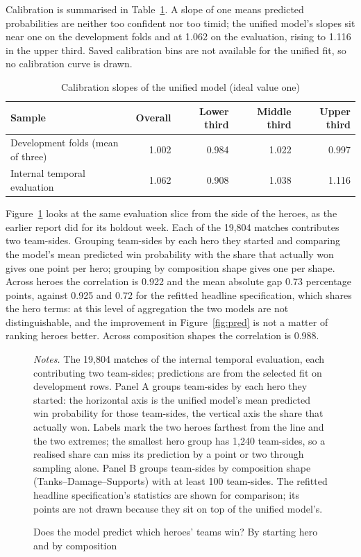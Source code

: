 \documentclass[11pt]{article}
\begin{document}
Calibration is summarised in Table~\ref{tab:cal}. A slope of one means predicted probabilities are neither
too confident nor too timid; the unified model's slopes sit near one on the development folds and at
1.062 on the evaluation, rising to 1.116 in the upper third. Saved calibration bins are
not available for the unified fit, so no calibration curve is drawn.

\begin{table}[H]\centering\small
\caption{Calibration slopes of the unified model (ideal value one)}\label{tab:cal}
\begin{tabular}{l r r r r}
\toprule
Sample & Overall & Lower third & Middle third & Upper third \\
\midrule
Development folds (mean of three) & 1.002 & 0.984 & 1.022 & 0.997 \\
Internal temporal evaluation & 1.062 & 0.908 & 1.038 & 1.116 \\
\bottomrule
\end{tabular}
\end{table}

Figure~\ref{fig:fit} looks at the same evaluation slice from the side of the heroes, as the earlier report did
for its holdout week. Each of the 19,804 matches contributes two team-sides. Grouping team-sides by each
hero they started and comparing the model's mean predicted win probability with the share that actually won
gives one point per hero; grouping by composition shape gives one per shape. Across heroes the correlation
is 0.922 and the mean absolute gap 0.73 percentage points, against 0.925
and 0.72 for the refitted headline specification, which shares the hero terms: at this level
of aggregation the two models are not distinguishable, and the improvement in Figure~\ref{fig:pred} is not
a matter of ranking heroes better. Across composition shapes the correlation is 0.988.

\begin{figure}[!tb]\centering
\caption{Does the model predict which heroes' teams win? By starting hero and by composition}
\label{fig:fit}
\vspace{2pt}


\begin{minipage}{0.95\linewidth}\footnotesize\vspace{2pt}
\emph{Notes.} The 19,804 matches of the internal temporal evaluation, each contributing two team-sides;
predictions are from the selected fit on development rows. Panel A groups team-sides by each hero they started:
the horizontal axis is the unified model's mean predicted win probability for those team-sides, the vertical
axis the share that actually won. Labels mark the two heroes farthest from the line and the two extremes; the
smallest hero group has 1,240 team-sides, so a realised share can miss its prediction by a
point or two through sampling alone. Panel B groups team-sides by composition shape (Tanks--Damage--Supports)
with at least 100 team-sides. The refitted headline specification's statistics are shown for
comparison; its points are not drawn because they sit on top of the unified model's.
\end{minipage}
\end{figure}
\end{document}
